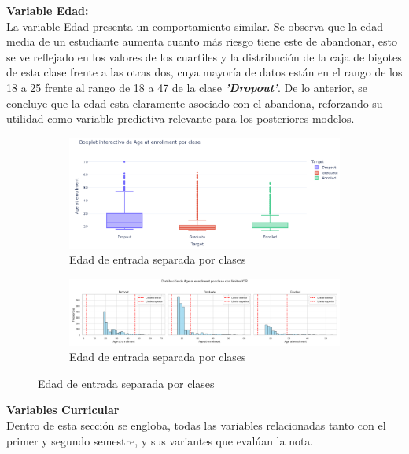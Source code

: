 \documentclass{report}[14pt]
\begin{document}
\textbf{Variable Edad:} \\
La variable Edad presenta un comportamiento similar. Se observa que la edad media de un estudiante aumenta cuanto más riesgo tiene este de abandonar, esto se ve reflejado en los valores de los cuartiles y la distribución de la caja de bigotes de esta clase frente a las otras dos, cuya mayoría de datos están en el rango de los 18 a 25 frente al rango de 18 a 47 de la clase \textbf{\textit{'Dropout'}}. De lo anterior, se concluye que la edad esta claramente asociado con el abandona, reforzando su utilidad como variable predictiva relevante para los posteriores modelos.
\begin{figure}
    \centering
    \begin{subfigure}[b]{.75\linewidth}
        \includegraphics[width=0.75\linewidth]{distribution_plotly/age.png}
        \caption{Edad de entrada separada por clases}
        \label{fig:boxplot-age}
    \end{subfigure} \hfill
  \begin{subfigure}[b]{.75\linewidth}
        \includegraphics[width=0.75\linewidth]{distribution/Age at enrollment_distribution.png}
        \caption{Edad de entrada separada por clases}
        \label{fig:histogram-age}
    \end{subfigure}
\end{figure}
\FloatBarrier
\textbf{Variables Curricular}\\
Dentro de esta sección se engloba, todas las variables relacionadas tanto con el primer y segundo semestre, y sus variantes que evalúan la nota.
\end{document}

